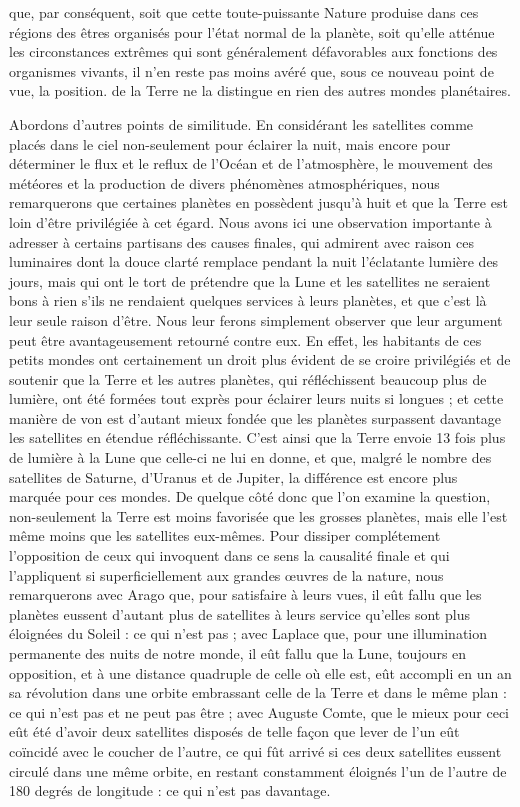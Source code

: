 \documentclass[a4paper, 11pt, oneside, landscape]{article}
\begin{document}
que, par conséquent, soit que cette toute-puissante Nature produise dans ces régions des êtres organisés pour l'état normal de la planète, soit qu'elle atténue les circonstances extrêmes qui sont généralement défavorables aux fonctions des organismes vivants, il n'en reste pas moins avéré que, sous ce nouveau point de vue, la position. de la Terre ne la distingue en rien des autres mondes planétaires.

Abordons d'autres points de similitude. En considérant les satellites comme placés dans le ciel non-seulement pour éclairer la nuit, mais encore pour déterminer le flux et le reflux de l'Océan et de l'atmosphère, le mouvement des météores et la production de divers phénomènes atmosphériques, nous remarquerons que certaines planètes en possèdent jusqu'à huit et que la Terre est loin d'être privilégiée à cet égard. Nous avons ici une observation importante à adresser à certains partisans des causes finales, qui admirent avec raison ces luminaires dont la douce clarté remplace pendant la nuit l'éclatante lumière des jours, mais qui ont le tort de prétendre que la Lune et les satellites ne seraient bons à rien s'ils ne rendaient quelques services à leurs planètes, et que c'est là leur seule raison d'être. Nous leur ferons simplement observer que leur argument peut être avantageusement retourné contre eux. En effet, les habitants de ces petits mondes ont certainement un droit plus évident de se croire privilégiés et de soutenir que la Terre et les autres planètes, qui réfléchissent beaucoup plus de lumière, ont été formées tout exprès pour éclairer leurs nuits si longues ; et cette manière de von est d'autant mieux fondée que les planètes surpassent davantage les satellites en étendue réfléchissante. C'est ainsi que la Terre envoie 13 fois plus de lumière à la Lune que celle-ci ne lui en donne, et que, malgré le nombre des satellites de Saturne, d'Uranus et de Jupiter, la différence est encore plus marquée pour ces mondes. De quelque côté donc que l'on examine la question, non-seulement la Terre est moins favorisée que les grosses planètes, mais elle l'est même moins que les satellites eux-mêmes. Pour dissiper complétement l'opposition de ceux qui invoquent dans ce sens la causalité finale et qui l'appliquent si superficiellement aux grandes œuvres de la nature, nous remarquerons avec Arago que, pour satisfaire à leurs vues, il eût fallu que les planètes eussent d'autant plus de satellites à leurs service qu'elles sont plus éloignées du Soleil : ce qui n'est pas ; avec Laplace que, pour une illumination permanente des nuits de notre monde, il eût fallu que la Lune, toujours en opposition, et à une distance quadruple de celle où elle est, eût accompli en un an sa révolution dans une orbite embrassant celle de la Terre et dans le même plan : ce qui n'est pas et ne peut pas être ; avec Auguste Comte, que le mieux pour ceci eût été d'avoir deux satellites disposés de telle façon que lever de l'un eût coïncidé avec le coucher de l'autre, ce qui fût arrivé si ces deux satellites eussent circulé dans une même orbite, en restant constamment éloignés l'un de l'autre de 180 degrés de longitude : ce qui n'est pas davantage.
\end{document}
